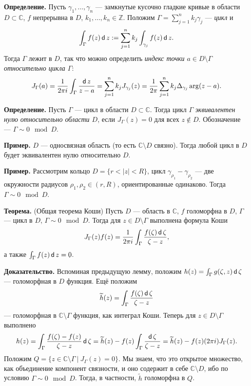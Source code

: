 \QED

\textbf{Определение.} Пусть $\gamma_1, \dots, \gamma_n$ --- замкнутые кусочно гладкие кривые в области $D \subset \mathbb C$, $f$ непрерывна в $D$, $k_1, \dots, k_n \in \mathbb Z$.
Положим $\Gamma = \sum_{j=1}^{n} k_j \gamma_j$ --- \textit{цикл} и
\[
    \int_\Gamma f(z) \operatorname{\mathsf d} z := \sum_{j=1}^{n} k_j \int_{\gamma_j} f(z) \operatorname{\mathsf d} z.
\]
Тогда $\Gamma$ лежит в $D$, так что можно определить \textit{индекс точки $a \in D \setminus \Gamma$ относительно цикла $\Gamma$}:
\[
    J_\Gamma(a) = \frac{1}{2\pi i} \int_\Gamma \frac{\operatorname{\mathsf d} z}{z - a} = \sum_{j=1}^{n} k_j J_{\gamma_j}(z) = \frac{1}{2\pi} \sum_{j=1}^{n} k_j \Delta_{\gamma_j} \arg(z - a).
\]

\textbf{Определение.} Пусть $\Gamma$ --- цикл в области $D \subset \mathbb C$.
Тогда цикл $\Gamma$ \textit{эквивалентен нулю относительно области $D$}, если $J_\Gamma(z) = 0$ для всех $z \not\in D$.
Обозначение --- $\Gamma \sim 0 \mod D$.

\textbf{Пример.} $D$ --- односвязная область (то есть $\mathbb C \setminus D$ связно).
Тогда любой цикл в $D$ будет эквивалентен нулю относительно $D$.

\textbf{Пример.} Рассмотрим кольцо $D = \{r < |z| < R\}$, цикл $\gamma_{\rho_1} - \gamma_{\rho_2}$ --- две окружности радиусов $\rho_1, \rho_2 \in (r, R)$, ориентированные одинаково.
Тогда $\Gamma \sim 0 \mod D$.

\textbf{Теорема.} (Общая теорема Коши)
Пусть $D$ --- область в $\mathbb C$, $f$ голоморфна в $D$, $\Gamma$ --- цикл в $D$, $\Gamma \sim 0 \mod D$.
Тогда для $z \in D \setminus \Gamma$ выполнена формула Коши
\[
    J_\Gamma(z) f(z) = \frac{1}{2\pi i} \int_\Gamma \frac{f(\zeta) \operatorname{\mathsf d} \zeta}{\zeta - z},
\]
а также $\int_\Gamma f(z) \operatorname{\mathsf d} z = 0$.

\textbf{Доказательство.} Вспоминая предыдущую лемму, положим $h(z) = \int_\Gamma g(\zeta, z) \operatorname{\mathsf d} \zeta$ --- голоморфная в $D$ функция.
Ещё положим
\[
    \widetilde h(z) = \int_\Gamma \frac{f(\zeta) \operatorname{\mathsf d} \zeta}{\zeta - z}
\]
--- голоморфная в $\mathbb C \setminus \Gamma$ функция, как интеграл Коши.
Теперь для $z \in D \setminus \Gamma$ выполнено 
\[
    h(z) = \int_\Gamma \frac{f(\zeta) - f(z)}{\zeta - z} \operatorname{\mathsf d} \zeta = \widetilde h(z) - f(z) \int_\Gamma \frac{\operatorname{\mathsf d} \zeta}{\zeta - z} = \widetilde h(z) - f(z) (2\pi i) J_\Gamma(z).
\]
Положим $Q = \{z \in \mathbb C \setminus \Gamma~|~J_\Gamma(z) = 0\}$.
Мы знаем, что это открытое множество, как объединение компонент связности, и оно содержит в себе $\mathbb C \setminus D$, ибо по условию $\Gamma \sim 0 \mod D$.
Тогда, в частности, $\widetilde h$ голоморфна в $Q$.

